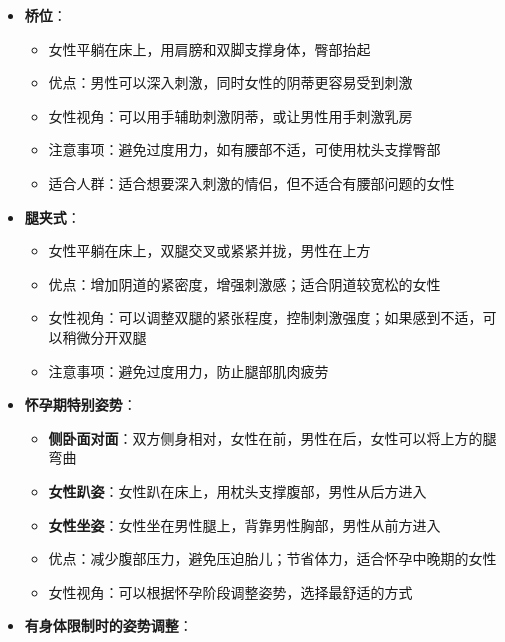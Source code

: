 \documentclass[12pt,UTF8]{ctexbook}
\begin{document}
\begin{itemize}
\begin{itemize}
\begin{itemize}
    \item 男性盘腿坐在床上，女性跨坐在男性腿上，双腿环绕男性腰部
    \item 优点：双方身体接触紧密，有更多的情感连接；女性可以控制节奏和深度
    \item 女性视角：可以将手臂环绕男性颈部，增加亲密感；如果感到不适，可以调整坐姿或稍微分开双腿
    \item 适合人群：适合想要更多亲密感和情感连接的情侣
    \end{itemize}
  \item \textbf{桥位}：
    \begin{itemize}
    \item 女性平躺在床上，用肩膀和双脚支撑身体，臀部抬起
    \item 优点：男性可以深入刺激，同时女性的阴蒂更容易受到刺激
    \item 女性视角：可以用手辅助刺激阴蒂，或让男性用手刺激乳房
    \item 注意事项：避免过度用力，如有腰部不适，可使用枕头支撑臀部
    \item 适合人群：适合想要深入刺激的情侣，但不适合有腰部问题的女性
    \end{itemize}
  \item \textbf{腿夹式}：
    \begin{itemize}
    \item 女性平躺在床上，双腿交叉或紧紧并拢，男性在上方
    \item 优点：增加阴道的紧密度，增强刺激感；适合阴道较宽松的女性
    \item 女性视角：可以调整双腿的紧张程度，控制刺激强度；如果感到不适，可以稍微分开双腿
    \item 注意事项：避免过度用力，防止腿部肌肉疲劳
    \end{itemize}
  \item \textbf{怀孕期特别姿势}：
    \begin{itemize}
    \item \textbf{侧卧面对面}：双方侧身相对，女性在前，男性在后，女性可以将上方的腿弯曲
    \item \textbf{女性趴姿}：女性趴在床上，用枕头支撑腹部，男性从后方进入
    \item \textbf{女性坐姿}：女性坐在男性腿上，背靠男性胸部，男性从前方进入
    \item 优点：减少腹部压力，避免压迫胎儿；节省体力，适合怀孕中晚期的女性
    \item 女性视角：可以根据怀孕阶段调整姿势，选择最舒适的方式
    \end{itemize}
  \item \textbf{有身体限制时的姿势调整}：

\end{itemize}
\end{itemize}
\end{document}
